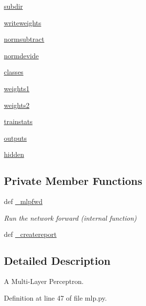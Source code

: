 \begin{DoxyCompactItemize}
\item 
\hyperlink{classmlp_1_1mlp_ad29044bad5109b92f57149d8bec68e14}{subdir}
\item 
\hyperlink{classmlp_1_1mlp_a07b85e2f033556b9ef42dbc9b05011c6}{writeweights}
\item 
\hyperlink{classmlp_1_1mlp_a9f1194a28bf6345709b62f34ef41a8f5}{normsubtract}
\item 
\hyperlink{classmlp_1_1mlp_a667ab65d926bd62ef896add5f059ce06}{normdevide}
\item 
\hyperlink{classmlp_1_1mlp_ae97e72b20c044203c2a86adc234eb9c5}{classes}
\item 
\hyperlink{classmlp_1_1mlp_af03c95450f5cae7754975376c0b80a66}{weights1}
\item 
\hyperlink{classmlp_1_1mlp_aab855561bd19a52513ee8b2c84facaba}{weights2}
\item 
\hyperlink{classmlp_1_1mlp_adf2a63cd452121ea5e135c191dc5723d}{trainstats}
\item 
\hyperlink{classmlp_1_1mlp_ad6d42a5405728d749f144b938b323ce1}{outputs}
\item 
\hyperlink{classmlp_1_1mlp_a4988ae34b275886fce8a1d4c6a167529}{hidden}
\end{DoxyCompactItemize}
\subsection*{Private Member Functions}
\begin{DoxyCompactItemize}
\item 
def \hyperlink{classmlp_1_1mlp_a50fab3d7313376cf2de90bcfc80db3a5}{\_\-mlpfwd}
\begin{DoxyCompactList}\small\item\em Run the network forward (internal function) \item\end{DoxyCompactList}\item 
def \hyperlink{classmlp_1_1mlp_a6adedb6cd519479a5bdec3ca7b3e0c08}{\_\-createreport}
\end{DoxyCompactItemize}


\subsection{Detailed Description}
A Multi-\/Layer Perceptron. 

Definition at line 47 of file mlp.py.



